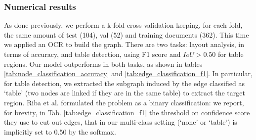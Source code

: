 \documentclass[runningheads]{llncs}
\begin{document}
\subsubsection{Numerical results}
As done previously, we perform a k-fold cross validation keeping, for each fold, the same amount of test (104), val (52) and training documents (362). This time we applied an OCR to build the graph. There are two tasks: layout analysis, in terms of accuracy, and table detection, using F1 score and $IoU > 0.50$ for table regions. Our model outperforms \cite{riba2019table} in both tasks, as shown in tables \ref{tab:node_classification_accuracy} and \ref{tab:edge_classification_f1}. In particular, for table detection, we extracted the subgraph induced by the edge classified as `table' (two nodes are linked if they are in the same table) to extract the target region. Riba et al. \cite{riba2019table} formulated the problem as a binary classification: we report, for brevity, in Tab. \ref{tab:edge_classification_f1} the threshold on confidence score they use to cut out edges, that in our multi-class setting (`none' or `table') is implicitly set to 0.50 by the softmax.

\begin{table}[b]
    \centering
    \caption{\textbf{Layout analysis results on RVL-CDIP Invoices}. Layout analysis accuracy scores depicted in terms of node classification task.}
    \label{tab:node_classification_accuracy}
\end{table}
\end{document}
